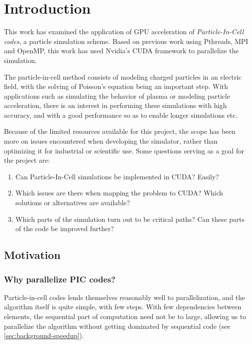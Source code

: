 \chapter{Introduction}

This work has examined the application of GPU acceleration of \emph{Particle-In-Cell codes}, a particle simulation scheme.
Based on previous work using Pthreads, MPI and OpenMP, this work has used Nvidia's CUDA framework to parallelize the
simulation.

The particle-in-cell method consists of modeling charged particles in an electric field, with the solving of Poisson's
equation being an important step. With applications such as simulating the behavior of plasma or modeling particle
acceleration, there is an interest in performing these simulations with high accuracy, and with a good performance so as
to enable longer simulations etc.

Because of the limited resources available for this project, the scope has been more on issues encountered when developing
the simulator, rather than optimizing it for industrial or scientific use. Some questions serving as a goal for the project are:

\begin{enumerate}
	\renewcommand{\theenumi}{\alph{enumi}}
	\item Can Particle-In-Cell simulations be implemented in CUDA? Easily? \label{list:introduction-ease}
	\item Which issues are there when mapping the problem to CUDA? Which solutions or alternatives are available? \label{list:introduction-issues}
	\item Which parts of the simulation turn out to be critical paths? Can these parts of the code be improved further? \label{list:introduction-bottleneck}
\end{enumerate}

\section{Motivation}
\subsection{Why parallelize PIC codes?}
Particle-in-cell codes lends themselves reasonably well to parallelization, and the algorithm itself is quite simple,
with few steps. With few dependencies between elements, the sequential part of computation need not be to large, allowing
us to parallelize the algorithm without getting dominated by sequential code (see \ref{sec:background-speedup}).

